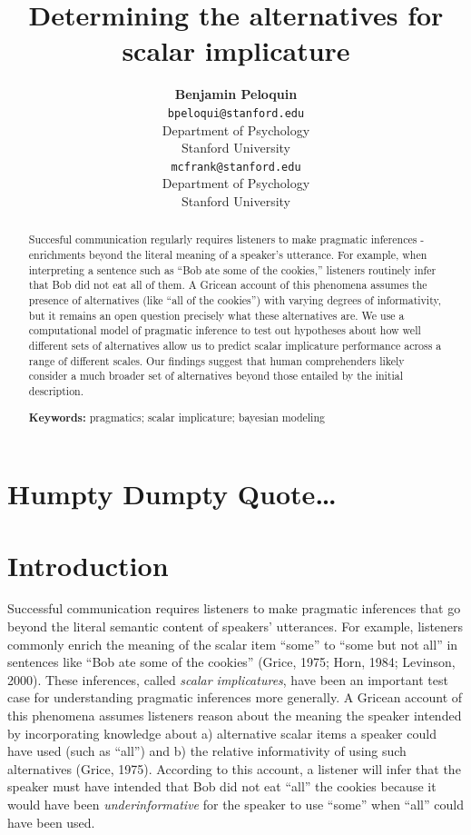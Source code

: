 \documentclass[10pt, letterpaper]{article}
\title{Determining the alternatives for scalar implicature}
\author{{\large \bf Benjamin Peloquin} \\ \texttt{bpeloqui@stanford.edu} \\ Department of Psychology \\ Stanford University \And {\large \bf Michael C. Frank} \\ \texttt{mcfrank@stanford.edu} \\ Department of Psychology \\ Stanford University}
\begin{document}
\maketitle

\begin{abstract}
Succesful communication regularly requires listeners to make pragmatic
inferences - enrichments beyond the literal meaning of a speaker's
utterance. For example, when interpreting a sentence such as ``Bob ate
some of the cookies,'' listeners routinely infer that Bob did not eat
all of them. A Gricean account of this phenomena assumes the presence of
alternatives (like ``all of the cookies'') with varying degrees of
informativity, but it remains an open question precisely what these
alternatives are. We use a computational model of pragmatic inference to
test out hypotheses about how well different sets of alternatives allow
us to predict scalar implicature performance across a range of different
scales. Our findings suggest that human comprehenders likely consider a
much broader set of alternatives beyond those entailed by the initial
description.

\textbf{Keywords:}
pragmatics; scalar implicature; bayesian modeling
\end{abstract}

\section{Humpty Dumpty Quote\ldots{}}\label{humpty-dumpty-quote}

\section{Introduction}\label{introduction}

Successful communication requires listeners to make pragmatic inferences
that go beyond the literal semantic content of speakers' utterances. For
example, listeners commonly enrich the meaning of the scalar item
``some'' to ``some but not all'' in sentences like ``Bob ate some of the
cookies'' (Grice, 1975; Horn, 1984; Levinson, 2000). These inferences,
called \emph{scalar implicatures}, have been an important test case for
understanding pragmatic inferences more generally. A Gricean account of
this phenomena assumes listeners reason about the meaning the speaker
intended by incorporating knowledge about a) alternative scalar items a
speaker could have used (such as ``all'') and b) the relative
informativity of using such alternatives (Grice, 1975). According to
this account, a listener will infer that the speaker must have intended
that Bob did not eat ``all'' the cookies because it would have been
\emph{underinformative} for the speaker to use ``some'' when ``all''
could have been used.
\end{document}
